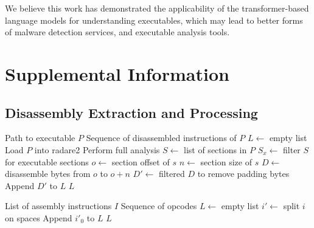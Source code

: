 \documentclass[conference,compsoc]{IEEEtran}
\begin{document}
We believe this work has demonstrated the applicability of the transformer-based language models for understanding executables, which may lead to better forms of malware detection services, and executable analysis tools. 




\appendices 
\section{Supplemental Information}



\subsection{Disassembly Extraction and Processing}

\begin{algorithm}[H]
\caption{Generate and extract disassembly from an executable}
\label{algo:disasm-extraction}
\begin{algorithmic}[1]
\REQUIRE Path to executable \(P\)
\ENSURE Sequence of disassembled instructions of \(P\)
\STATE \(L \gets\) empty list
\STATE Load \(P\) into radare2
\STATE Perform full analysis 
    \RETURN
\ENDIF
\STATE \(S \gets\) list of sections in \(P\) 
\STATE \(S_x \gets\) filter \(S\) for executable sections 
    \STATE \(o \gets\) section offset of \(s\)
    \STATE \(n \gets\) section size of \(s\)
    \STATE \(D \gets\) disassemble bytes from \(o\) to \(o + n\) 
    \STATE \(D' \gets\) filtered \(D\) to remove padding bytes 
    \STATE Append \(D'\) to \(L\)
\ENDFOR
\RETURN \(L\)
\end{algorithmic}
\end{algorithm}

\begin{algorithm}[H]
\caption{Extract opcodes from disassembly}
\label{algo:opcode-sequence-extraction}
\begin{algorithmic}[1]
\REQUIRE List of assembly instructions \(I\)
\ENSURE Sequence of opcodes
\STATE \(L \gets\) empty list
    \STATE \(i' \gets\) split \(i\) on spaces
    \STATE Append \(i'_0\) to \(L\)
\ENDFOR
\RETURN \(L\)
\end{algorithmic}
\end{algorithm}
\end{document}
